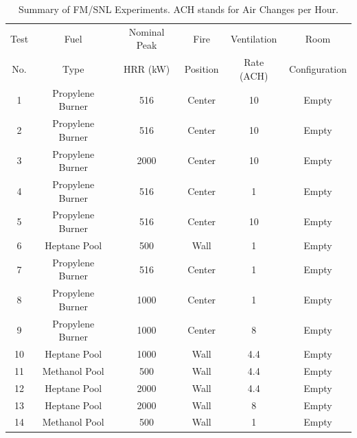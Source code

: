 \begin{table}[!ht]
\centering
\caption[Summary of FM/SNL Experiments]{Summary of FM/SNL Experiments. ACH stands for Air Changes per Hour.}
\begin{tabular}{|c|c|c|c|c|c|}
\hline
Test    &  Fuel             & Nominal Peak  & Fire          & Ventilation       & Room                   \\
No.     &  Type             & HRR (kW)      & Position      & Rate (ACH)        & Configuration          \\ \hline \hline
1       & Propylene Burner  &     516       & Center        & 10                & Empty                  \\ \hline
2       & Propylene Burner  &     516       & Center        & 10                & Empty                  \\ \hline
3       & Propylene Burner  &    2000       & Center        & 10                & Empty                  \\ \hline
4       & Propylene Burner  &     516       & Center        & 1                 & Empty                  \\ \hline
5       & Propylene Burner  &     516       & Center        & 10                & Empty                  \\ \hline
6       & Heptane Pool      &     500       & Wall          & 1                 & Empty                  \\ \hline
7       & Propylene Burner  &     516       & Center        & 1                 & Empty                  \\ \hline
8       & Propylene Burner  &    1000       & Center        & 1                 & Empty                  \\ \hline
9       & Propylene Burner  &    1000       & Center        & 8                 & Empty                  \\ \hline
10      & Heptane Pool      &    1000       & Wall          & 4.4               & Empty                  \\ \hline
11      & Methanol Pool     &     500       & Wall          & 4.4               & Empty                  \\ \hline
12      & Heptane Pool      &    2000       & Wall          & 4.4               & Empty                  \\ \hline
13      & Heptane Pool      &    2000       & Wall          & 8                 & Empty                  \\ \hline
14      & Methanol Pool     &     500       & Wall          & 1                 & Empty                  \\ \hline

\end{tabular}
\end{table}
